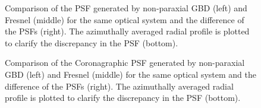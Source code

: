 \begin{figure}[H]
    \centering
    \caption{Comparison of the PSF generated by non-paraxial GBD (left) and Fresnel (middle) for the same optical system and the difference of the PSFs (right). The azimuthally averaged radial profile is plotted to clarify the discrepancy in the PSF (bottom).}
    \label{fig:nonparaxial_psf}
\end{figure}

\begin{figure}[H]
    \centering
    \caption{Comparison of the Coronagraphic PSF generated by non-paraxial GBD (left) and Fresnel (middle) for the same optical system and the difference of the PSFs (right). The azimuthally averaged radial profile is plotted to clarify the discrepancy in the PSF (bottom).}
    \label{fig:nonparaxial_coronagraph}
\end{figure}